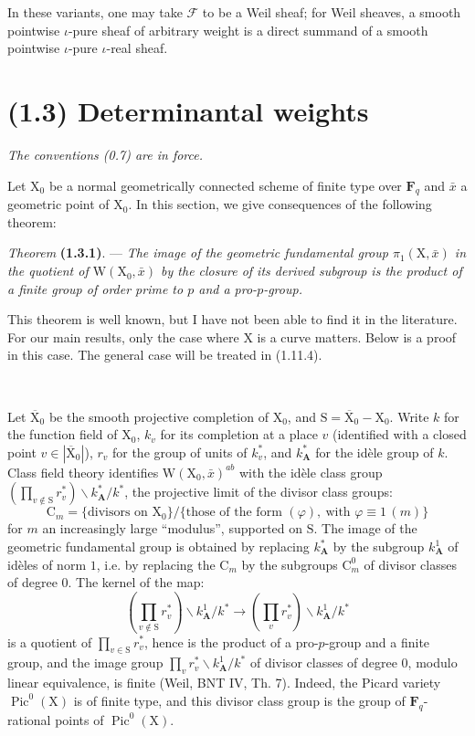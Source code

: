 \documentclass[11pt,leqno]{article}
\newcommand{\Page}[1]{\ifvmode\noindent\else\unskip\ \fi{\footnotesize\textcolor{gray}{[p.\,#1]}}\ \ignorespaces}
\begin{document}
In these variants, one may take \(\mathscr{F}\) to be a Weil sheaf; for Weil sheaves, a smooth pointwise \(\iota\)-pure sheaf of arbitrary weight is a direct summand of a smooth pointwise \(\iota\)-pure \(\iota\)-real sheaf.

\section*{(1.3) Determinantal weights}

\textit{The conventions \textup{(0.7)} are in force.}

Let \(\mathrm{X}_0\) be a normal geometrically connected scheme of finite type over \(\mathbf{F}_q\) and \(\bar{x}\) a geometric point of \(\mathrm{X}_0\). In this section, we give consequences of the following theorem:

\textit{Theorem} \textbf{(1.3.1)}. — \textit{The image of the geometric fundamental group \(\pi_1(\mathrm{X},\bar{x})\) in the quotient of \(\mathrm{W}(\mathrm{X}_0,\bar{x})\) by the closure of its derived subgroup is the product of a finite group of order prime to \(p\) and a pro-\(p\)-group.}

This theorem is well known, but I have not been able to find it in the literature. For our main results, only the case where \(\mathrm{X}\) is a curve matters. Below is a proof in this case. The general case will be treated in (1.11.4).

\Page{157}

Let \(\overline{\mathrm{X}}_0\) be the smooth projective completion of \(\mathrm{X}_0\), and \(\mathrm{S}=\overline{\mathrm{X}}_0-\mathrm{X}_0\). Write \(k\) for the function field of \(\mathrm{X}_0\), \(k_v\) for its completion at a place \(v\) (identified with a closed point \(v\in|\overline{\mathrm{X}}_0|\)), \(r_v\) for the group of units of \(k_v^*\), and \(k_{\mathbf{A}}^*\) for the idèle group of \(k\). Class field theory identifies \(\mathrm{W}(\mathrm{X}_0,\bar{x})^{ab}\) with the idèle class group \((\prod\limits_{v\notin\mathrm{S}}r_v^*)\backslash k_{\mathbf{A}}^*/k^*\), the projective limit of the divisor class groups:
\[
\mathrm{C}_m
=\{\text{divisors on }\mathrm{X}_0\}/
 \{\text{those of the form }(\varphi),\ \text{with }\varphi\equiv1\,(m)\}
\]
for \(m\) an increasingly large “modulus”, supported on \(\mathrm{S}\). The image of the geometric fundamental group is obtained by replacing \(k_{\mathbf{A}}^*\) by the subgroup \(k_{\mathbf{A}}^1\) of idèles of norm \(1\), i.e. by replacing the \(\mathrm{C}_m\) by the subgroups \(\mathrm{C}_m^0\) of divisor classes of degree \(0\). The kernel of the map:
\[
(\prod_{v\notin\mathrm{S}}r_v^*)\backslash k_{\mathbf{A}}^1/k^*
\longrightarrow
(\prod_v r_v^*)\backslash k_{\mathbf{A}}^1/k^*
\]
is a quotient of \(\prod\limits_{v\in\mathrm{S}}r_v^*\), hence is the product of a pro-\(p\)-group and a finite group, and the image group \(\prod\limits_v r_v^*\backslash k_{\mathbf{A}}^1/k^*\) of divisor classes of degree \(0\), modulo linear equivalence, is finite (Weil, BNT IV, Th. 7). Indeed, the Picard variety \(\operatorname{Pic}^0(\mathrm{X})\) is of finite type, and this divisor class group is the group of \(\mathbf{F}_q\)-rational points of \(\operatorname{Pic}^0(\mathrm{X})\).
\end{document}

